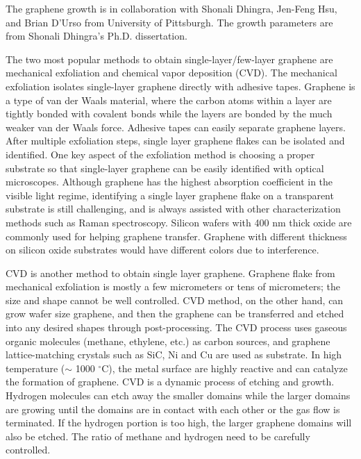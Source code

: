 \documentclass[pdflatex, sectionletters, 12pt]{pittetd}    %
\begin{document}
The graphene growth is in collaboration with Shonali Dhingra, Jen-Feng Hsu, and Brian D'Urso from University of Pittsburgh. The growth parameters are from Shonali Dhingra's Ph.D. dissertation\cite{dhingra2015quadratic}.

The two most popular methods to obtain single-layer/few-layer graphene are mechanical exfoliation\cite{novoselov2004electric} and chemical vapor deposition (CVD)\cite{kim2009large}. The mechanical exfoliation isolates single-layer graphene directly with adhesive tapes. Graphene is a type of van der Waals material, where the carbon atoms within a layer are tightly bonded with covalent bonds while the layers are bonded by the much weaker van der Waals force. Adhesive tapes can easily separate graphene layers. After multiple exfoliation steps, single layer graphene flakes can be isolated and identified\cite{novoselov2004electric}. One key aspect of the exfoliation method is choosing a proper substrate so that single-layer graphene can be easily identified with optical microscopes. Although graphene has the highest absorption coefficient in the visible light regime\cite{nair2008fine}, identifying a single layer graphene flake on a transparent substrate is still challenging, and is always assisted with other characterization methods such as Raman spectroscopy\cite{ferrari2006raman}. Silicon wafers with 400 nm thick oxide are commonly used for helping graphene transfer. Graphene with different thickness on silicon oxide substrates would have different colors due to interference.

CVD is another method to obtain single layer graphene\cite{kim2009large}. Graphene flake from mechanical exfoliation is mostly a few micrometers or tens of micrometers; the size and shape cannot be well controlled. CVD method, on the other hand, can grow wafer size graphene\cite{lee2010wafer}, and then the graphene can be transferred and etched into any desired shapes through post-processing. The CVD process uses gaseous organic molecules (methane, ethylene, etc.) as carbon sources, and graphene lattice-matching crystals such as SiC, Ni and Cu are used as substrate. In high temperature ($\sim$ 1000 $^{\circ}$C), the metal surface are highly reactive and can catalyze the formation of graphene. CVD is a dynamic process of etching and growth. Hydrogen molecules can etch away the smaller domains while the larger domains are growing\cite{vlassiouk2011role, zhang2012anisotropic} until the domains are in contact with each other or the gas flow is terminated. If the hydrogen portion is too high, the larger graphene domains will also be etched. The ratio of methane and hydrogen need to be carefully controlled.
\end{document}
